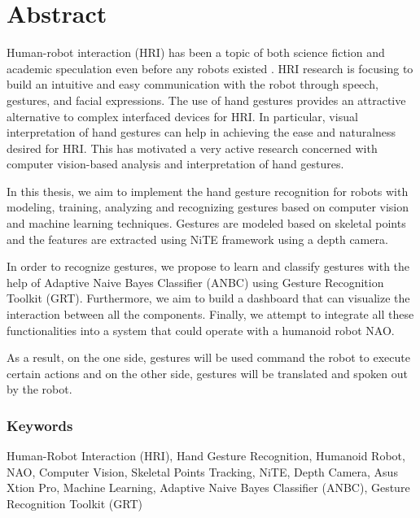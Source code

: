 \chapter*{Abstract}
Human-robot interaction (HRI) has been a topic of both science fiction and academic speculation even before any robots existed \cite{7}. HRI research is focusing to build an intuitive and easy communication with the robot through speech, gestures, and facial expressions. The use of hand gestures provides an attractive alternative to complex interfaced devices for HRI. In particular, visual interpretation of hand gestures can help in achieving the ease and naturalness desired for HRI. This has motivated a very active research concerned with computer vision-based analysis and interpretation of hand gestures.

In this thesis, we aim to implement the hand gesture recognition for robots with modeling, training, analyzing and recognizing gestures based on computer vision and machine learning techniques. Gestures are modeled based on skeletal points and the features are extracted using NiTE framework using a depth camera. 

In order to recognize gestures, we propose to learn and classify gestures with the help of Adaptive Naive Bayes Classifier (ANBC) using Gesture Recognition Toolkit (GRT). Furthermore, we aim to build a dashboard that can visualize the interaction between all the components. Finally, we attempt to integrate all these functionalities into a system that could operate with a humanoid robot NAO.

As a result, on the one side, gestures will be used command the robot to execute certain actions and on the other side, gestures will be translated and spoken out by the robot. 


\subsection*{Keywords} Human-Robot Interaction (HRI), Hand Gesture Recognition, Humanoid Robot, NAO, Computer Vision, Skeletal Points Tracking, NiTE, Depth Camera, Asus Xtion Pro, Machine Learning, Adaptive Naive Bayes Classifier (ANBC), Gesture Recognition Toolkit (GRT)


